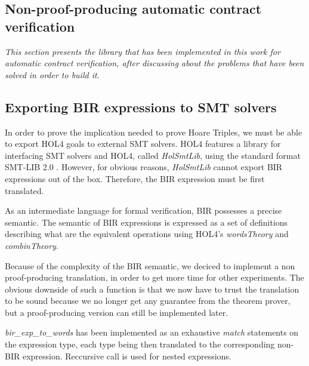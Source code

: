 \documentclass[10pt,a4paper]{article}
\begin{document}
\begin{multicols}{2}

\section{Non-proof-producing automatic contract verification} \label{impl-non-pp-wp-lib}
\textit{This section presents the library that has been implemented in this work for automatic contract verification, after discussing about the problems that have been solved in order to build it.}

\subsection{Exporting BIR expressions to SMT solvers} \label{exporting-bir-to-smt}


In order to prove the implication needed to prove Hoare Triples, we must be able to export HOL4 goals to external SMT solvers. HOL4 features a library for interfacing {SMT} solvers and HOL4, called \textit{HolSmtLib}, using the standard format SMT-LIB 2.0 \cite{barrett_satisfiability_2016}. However, for obvious reasons, \textit{HolSmtLib} cannot export BIR expressions out of the box. Therefore, the BIR expression must be first translated.

As an intermediate language for formal verification, {BIR} possesses a precise semantic. The semantic of BIR expressions is expressed as a set of definitions describing what are the equivalent operations using HOL4's \textit{wordsTheory} and \textit{combinTheory}.

Because of the complexity of the BIR semantic, we deciced to implement a non proof-producing translation, in order to get more time for other experiments. The obvious downside of such a function is that we now have to trust the translation to be sound because we no longer get any guarantee from the theorem prover, but a proof-producing version can still be implemented later.

\textit{bir\_exp\_to\_words} has been implemented as an exhaustive \textit{match} statements on the expression type, each type being then translated to the corresponding non-BIR expression. Reccursive call is used for nested expressions.


\end{multicols}
\end{document}

